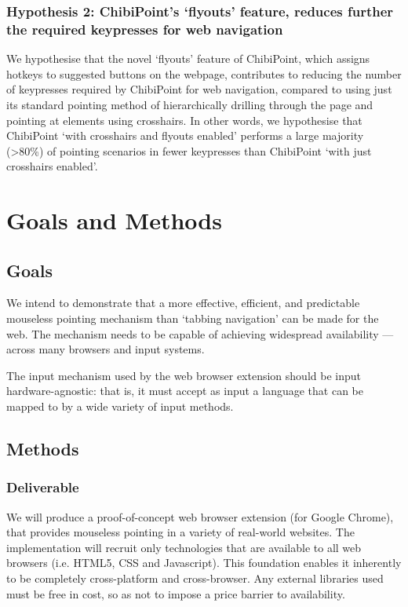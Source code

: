 \documentclass[11pt,openright,a4paper]{report}
\begin{document}
\newcommand{\hyptwo}{Hypothesis 2: ChibiPoint's `flyouts' feature, reduces further the required keypresses for web navigation}
\subsubsection{\hyptwo}
We hypothesise that the novel `flyouts' feature of ChibiPoint, which assigns hotkeys to suggested buttons on the webpage, contributes to reducing the number of keypresses required by ChibiPoint for web navigation, compared to using just its standard pointing method of hierarchically drilling through the page and pointing at elements using crosshairs.
In other words, we hypothesise that ChibiPoint `with crosshairs and flyouts enabled' performs a large majority (>80\%) of pointing scenarios in fewer keypresses than ChibiPoint `with just crosshairs enabled'.

\section{Goals and Methods}
\subsection{Goals}
We intend to demonstrate that a more effective, efficient, and predictable mouseless pointing mechanism than `tabbing navigation' can be made for the web. The mechanism needs to be capable of achieving widespread availability --- across many browsers and input systems.

The input mechanism used by the web browser extension should be input hardware-agnostic: that is, it must accept as input a language that can be mapped to by a wide variety of input methods.

\subsection{Methods}
\subsubsection{Deliverable}
We will produce a proof-of-concept web browser extension (for Google Chrome), that provides mouseless pointing in a variety of real-world websites. The implementation will recruit only technologies that are available to all web browsers (i.e. HTML5, CSS and Javascript). This foundation enables it inherently to be completely cross-platform and cross-browser. Any external libraries used must be free in cost, so as not to impose a price barrier to availability.
\end{document}
